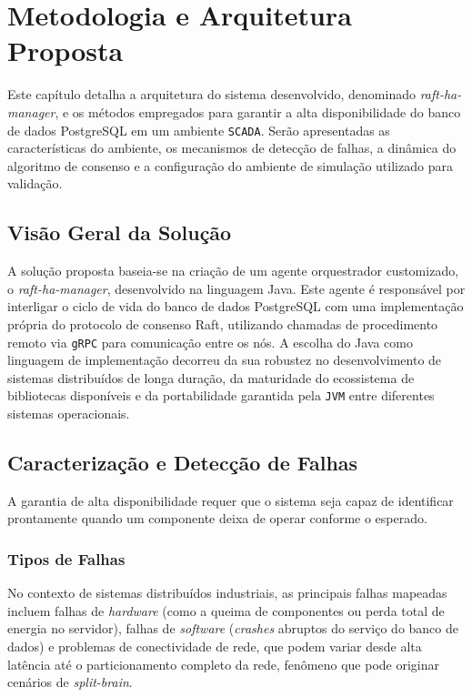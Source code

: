\chapter{Metodologia e Arquitetura Proposta}
\label{arquitetura}

    Este capítulo detalha a arquitetura do sistema desenvolvido, denominado \textit{raft-ha-manager}, e os métodos empregados para garantir a alta disponibilidade do banco de dados PostgreSQL em um ambiente \verb|SCADA|. Serão apresentadas as características do ambiente, os mecanismos de detecção de falhas, a dinâmica do algoritmo de consenso e a configuração do ambiente de simulação utilizado para validação.

    \section{Visão Geral da Solução}
    
        A solução proposta baseia-se na criação de um agente orquestrador customizado, o \textit{raft-ha-manager}, desenvolvido na linguagem Java. Este agente é responsável por interligar o ciclo de vida do banco de dados PostgreSQL com uma implementação própria do protocolo de consenso Raft, utilizando chamadas de procedimento remoto via \verb|gRPC| para comunicação entre os nós. A escolha do Java como linguagem de implementação decorreu da sua robustez no desenvolvimento de sistemas distribuídos de longa duração, da maturidade do ecossistema de bibliotecas disponíveis e da portabilidade garantida pela \verb|JVM| entre diferentes sistemas operacionais.
    
    \section{Caracterização e Detecção de Falhas}
    
        A garantia de alta disponibilidade requer que o sistema seja capaz de identificar prontamente quando um componente deixa de operar conforme o esperado.
    
        \subsection{Tipos de Falhas}
        No contexto de sistemas distribuídos industriais, as principais falhas mapeadas incluem falhas de \textit{hardware} (como a queima de componentes ou perda total de energia no servidor), falhas de \textit{software} (\textit{crashes} abruptos do serviço do banco de dados) e problemas de conectividade de rede, que podem variar desde alta latência até o particionamento completo da rede, fenômeno que pode originar cenários de \textit{split-brain}.


